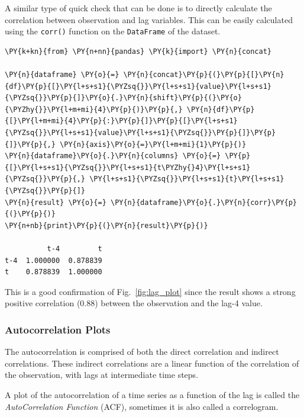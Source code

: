 A similar type of quick check that can be done is to directly calculate
the correlation between observation and lag variables. This
can be easily calculated using the \texttt{corr()} function
on the \texttt{DataFrame} of the dataset.

\begin{codebox}[breakable, size=fbox, boxrule=1pt, pad at break*=1mm,colback=cellbackground, colframe=cellborder]
\begin{Verbatim}[commandchars=\\\{\}]
\PY{k+kn}{from} \PY{n+nn}{pandas} \PY{k}{import} \PY{n}{concat}

\PY{n}{dataframe} \PY{o}{=} \PY{n}{concat}\PY{p}{(}\PY{p}{[}\PY{n}{df}\PY{p}{[}\PY{l+s+s1}{\PYZsq{}}\PY{l+s+s1}{value}\PY{l+s+s1}{\PYZsq{}}\PY{p}{]}\PY{o}{.}\PY{n}{shift}\PY{p}{(}\PY{o}{\PYZhy{}}\PY{l+m+mi}{4}\PY{p}{)}\PY{p}{,} \PY{n}{df}\PY{p}{[}\PY{l+m+mi}{4}\PY{p}{:}\PY{p}{]}\PY{p}{[}\PY{l+s+s1}{\PYZsq{}}\PY{l+s+s1}{value}\PY{l+s+s1}{\PYZsq{}}\PY{p}{]}\PY{p}{]}\PY{p}{,} \PY{n}{axis}\PY{o}{=}\PY{l+m+mi}{1}\PY{p}{)}
\PY{n}{dataframe}\PY{o}{.}\PY{n}{columns} \PY{o}{=} \PY{p}{[}\PY{l+s+s1}{\PYZsq{}}\PY{l+s+s1}{t\PYZhy{}4}\PY{l+s+s1}{\PYZsq{}}\PY{p}{,} \PY{l+s+s1}{\PYZsq{}}\PY{l+s+s1}{t}\PY{l+s+s1}{\PYZsq{}}\PY{p}{]}
\PY{n}{result} \PY{o}{=} \PY{n}{dataframe}\PY{o}{.}\PY{n}{corr}\PY{p}{(}\PY{p}{)}
\PY{n+nb}{print}\PY{p}{(}\PY{n}{result}\PY{p}{)}

          t-4         t
t-4  1.000000  0.878839
t    0.878839  1.000000
\end{Verbatim}
\end{codebox}

This is a good confirmation of Fig.~\ref{fig:lag_plot} since the result 
shows a strong
positive correlation (0.88) between the observation and the lag-4 value.

\subsubsection{Autocorrelation Plots}
\label{autocorrelation-plots}

The autocorrelation is comprised of both
the direct correlation and indirect correlations. These indirect
correlations are a linear function of the correlation of the
observation, with lags at intermediate time steps.

A plot of the autocorrelation of a time series as a function of the lag 
is called the \emph{AutoCorrelation Function} (ACF), sometimes it is 
also called a correlogram.

